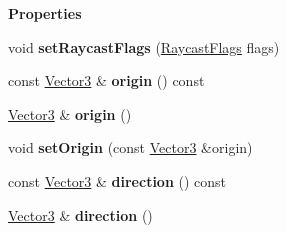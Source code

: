\begin{Indent}\textbf{ Properties}\par
\begin{DoxyCompactItemize}
\item 
\mbox{\label{classrev_1_1_world_ray_a931069ee3a418130737e6d81b4d6cf49}} 
void {\bfseries set\+Raycast\+Flags} (\mbox{\hyperlink{classrev_1_1_flags}{Raycast\+Flags}} flags)
\item 
\mbox{\label{classrev_1_1_world_ray_ae0f29396a6d37c4a1aaf88a97d90c29f}} 
const \mbox{\hyperlink{classrev_1_1_vector}{Vector3}} \& {\bfseries origin} () const
\item 
\mbox{\label{classrev_1_1_world_ray_a75c0a3dd83ba8c24aefa6ff337afb5df}} 
\mbox{\hyperlink{classrev_1_1_vector}{Vector3}} \& {\bfseries origin} ()
\item 
\mbox{\label{classrev_1_1_world_ray_a805afbb967aa1365858318733c26d2b9}} 
void {\bfseries set\+Origin} (const \mbox{\hyperlink{classrev_1_1_vector}{Vector3}} \&origin)
\item 
\mbox{\label{classrev_1_1_world_ray_aa91cd2ecf673d10c99cf6de781597f61}} 
const \mbox{\hyperlink{classrev_1_1_vector}{Vector3}} \& {\bfseries direction} () const
\item 
\mbox{\label{classrev_1_1_world_ray_a77dc3d9b9b6e7d4a74c1a194bdc72646}} 
\mbox{\hyperlink{classrev_1_1_vector}{Vector3}} \& {\bfseries direction} ()
\end{DoxyCompactItemize}
\end{Indent}
